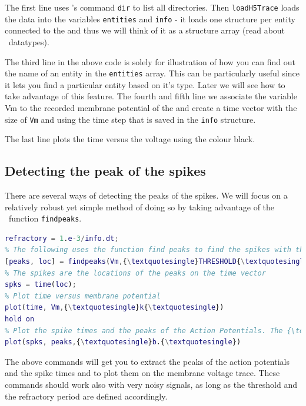 The first line uses \matlab 's command \texttt{dir} to list all
directories. Then \texttt{loadH5Trace} loads the data into the
variables \texttt{entities} and \texttt{info} -  it loads one
structure per entity connected to the 
and thus we will think of it as a structure array (read about \matlab\
datatypes).

The third line in the above code is solely for illustration of how you
can find out the name of an entity in the \texttt{entities}
array. This can be particularly useful since it lets you find a
particular entity based on it's type. Later we will see how to take
advantage of this feature.
The fourth and fifth line we associate the variable Vm to the recorded
membrane potential of the \nameref{entities:lifneuron} and create a
time vector with the size of \texttt{Vm} and using the time step that
is saved in the \texttt{info} structure.

The last line plots the time versus the voltage using the colour black.

\subsection{Detecting the peak of the spikes}

There are several ways of detecting the peaks of the spikes. We will
focus on a relatively robust yet simple method of doing so by taking
advantage of the \matlab\ function \texttt{findpeaks}.

\begin{lstlisting}[language=matlab,morekeywords={findpeaks,THRESHOLD,MINPEAKDISTANCE},escapeinside=\{\}]
% Define the refractory period of the peak detector (1ms); this can be useful when dealing with noisy signals.
refractory = 1.e-3/info.dt; 
% The following uses the function find peaks to find the spikes with threshold crossing at 0mV and a refractory period. 
[peaks, loc] = findpeaks(Vm,{\textquotesingle}THRESHOLD{\textquotesingle},0,{\textquotesingle}MINPEAKDISTANCE{\textquotesingle},refractory);
% The spikes are the locations of the peaks on the time vector
spks = time(loc);
% Plot time versus membrane potential
plot(time, Vm,{\textquotesingle}k{\textquotesingle})
hold on
% Plot the spike times and the peaks of the Action Potentials. The {\textquotesingle}hold on{\textquotesingle} command makes that the plots overlap.
plot(spks, peaks,{\textquotesingle}b.{\textquotesingle})
\end{lstlisting}

The above commands will get you to extract the peaks of the action
potentials and the spike times and to plot them on the membrane
voltage trace.
These commands should work also with very noisy signals, as long as
the threshold and the refractory period are defined accordingly.

